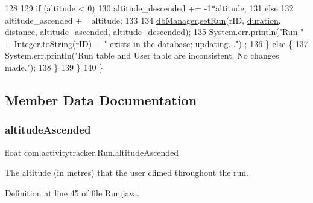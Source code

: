 \begin{DoxyCode}
128 
129                 \textcolor{keywordflow}{if} (altitude < 0)
130                     altitude\_descended += -1*altitude;
131                 \textcolor{keywordflow}{else}
132                     altitude\_ascended += altitude;
133 
134                 \mbox{\hyperlink{classcom_1_1activitytracker_1_1_run_ab90e32eda9f4c671ae3575f971edca6b}{dbManager}}.\mbox{\hyperlink{classcom_1_1activitytracker_1_1_d_b_manager_aa088e156858d8d661e2f43c1054c51c8}{setRun}}(rID, \mbox{\hyperlink{classcom_1_1activitytracker_1_1_run_a5e38d293d29d4b65c9290ff4bee82e03}{duration}}, \mbox{\hyperlink{classcom_1_1activitytracker_1_1_run_a7b4ca8c4ecea4da1653f03b8c8fc16a8}{distance}}, altitude\_ascended,
       altitude\_descended);
135                 System.err.println(\textcolor{stringliteral}{"Run "} + Integer.toString(rID) + \textcolor{stringliteral}{" exists in the database; updating..."})
      ;
136             \} \textcolor{keywordflow}{else} \{
137                 System.err.println(\textcolor{stringliteral}{"Run table and User table are inconsistent. No changes made."});
138             \}
139         \}
140     \}
\end{DoxyCode}


\subsection{Member Data Documentation}
\mbox{\label{classcom_1_1activitytracker_1_1_run_ad28bf8d709b4cfcdb93a51033a90728c}} 
\subsubsection{\texorpdfstring{altitude\+Ascended}{altitudeAscended}}
{\footnotesize\ttfamily float com.\+activitytracker.\+Run.\+altitude\+Ascended\hspace{0.3cm}{\ttfamily [package]}}

The altitude (in metres) that the user climed throughout the run. 

Definition at line 45 of file Run.\+java.

\mbox{\label{classcom_1_1activitytracker_1_1_run_a4997349f78c9147a30811306c2ab5223}} 
